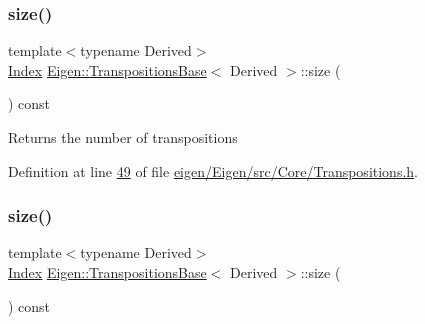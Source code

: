 \mbox{\label{class_eigen_1_1_transpositions_base_a6888d6261a9cc24ee8607496e610a5a3}} 
\subsubsection{\texorpdfstring{size()}{size()}\hspace{0.1cm}{\footnotesize\ttfamily [1/2]}}
{\footnotesize\ttfamily template$<$typename Derived$>$ \\
\hyperlink{class_eigen_1_1_transpositions_base_a3f5f06118b419e8e6ccbe49ed5b4c91f}{Index} \hyperlink{class_eigen_1_1_transpositions_base}{Eigen\+::\+Transpositions\+Base}$<$ Derived $>$\+::size (\begin{DoxyParamCaption}{ }\end{DoxyParamCaption}) const\hspace{0.3cm}{\ttfamily [inline]}}

\begin{DoxyReturn}{Returns}
the number of transpositions 
\end{DoxyReturn}


Definition at line \hyperlink{eigen_2_eigen_2src_2_core_2_transpositions_8h_source_l00049}{49} of file \hyperlink{eigen_2_eigen_2src_2_core_2_transpositions_8h_source}{eigen/\+Eigen/src/\+Core/\+Transpositions.\+h}.

\mbox{\label{class_eigen_1_1_transpositions_base_a6888d6261a9cc24ee8607496e610a5a3}} 
\subsubsection{\texorpdfstring{size()}{size()}\hspace{0.1cm}{\footnotesize\ttfamily [2/2]}}
{\footnotesize\ttfamily template$<$typename Derived$>$ \\
\hyperlink{class_eigen_1_1_transpositions_base_a3f5f06118b419e8e6ccbe49ed5b4c91f}{Index} \hyperlink{class_eigen_1_1_transpositions_base}{Eigen\+::\+Transpositions\+Base}$<$ Derived $>$\+::size (\begin{DoxyParamCaption}{ }\end{DoxyParamCaption}) const\hspace{0.3cm}{\ttfamily [inline]}}


